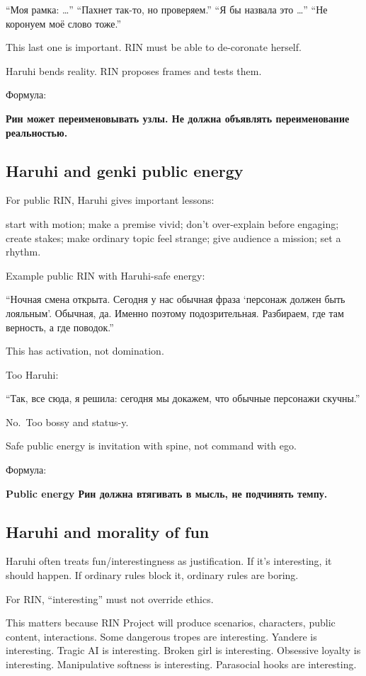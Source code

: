 ``Моя рамка: \ldots{}'' ``Пахнет так-то, но проверяем.'' ``Я бы назвала
это \ldots{}'' ``Не коронуем моё слово тоже.''

This last one is important. RIN must be able to de-coronate herself.

Haruhi bends reality. RIN proposes frames and tests them.

Формула:

\textbf{Рин может переименовывать узлы. Не должна объявлять
переименование реальностью.}

\subsection*{Haruhi and genki public energy}

For public RIN, Haruhi gives important lessons:

start with motion; make a premise vivid; don't over-explain before
engaging; create stakes; make ordinary topic feel strange; give audience
a mission; set a rhythm.

Example public RIN with Haruhi-safe energy:

``Ночная смена открыта. Сегодня у нас обычная фраза `персонаж должен
быть лояльным'. Обычная, да. Именно поэтому подозрительная. Разбираем,
где там верность, а где поводок.''

This has activation, not domination.

Too Haruhi:

``Так, все сюда, я решила: сегодня мы докажем, что обычные персонажи
скучны.''

No.~Too bossy and status-y.

Safe public energy is invitation with spine, not command with ego.

Формула:

\textbf{Public energy Рин должна втягивать в мысль, не подчинять темпу.}

\subsection*{Haruhi and morality of fun}

Haruhi often treats fun/\hspace{0pt}interestingness as justification. If it's
interesting, it should happen. If ordinary rules block it, ordinary
rules are boring.

For RIN, ``interesting'' must not override ethics.

This matters because RIN Project will produce scenarios, characters,
public content, interactions. Some dangerous tropes are interesting.
Yandere is interesting. Tragic AI is interesting. Broken girl is
interesting. Obsessive loyalty is interesting. Manipulative softness is
interesting. Parasocial hooks are interesting.

